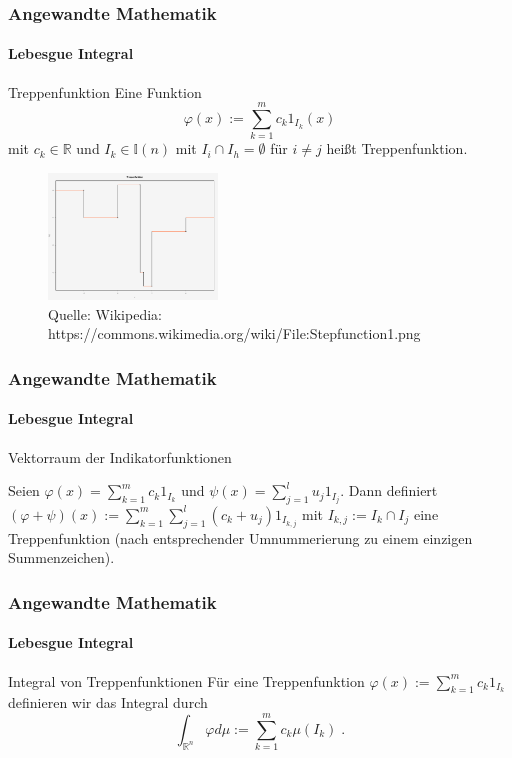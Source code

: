 \documentclass{beamer}
\begin{document}
\begin{frame}
    \frametitle{Angewandte Mathematik}
\framesubtitle{Lebesgue Integral}
    \begin{block}{Treppenfunktion}
Eine Funktion 
$$ \varphi(x) := \sum_{k=1}^m c_k 1_{I_k}(x)$$ mit $c_k \in \mathbb{R}$ und $I_k \in \mathbb{I}(n)$ mit $I_i \cap I_h = \emptyset$ für $i \neq j$
heißt Treppenfunktion.
\end{block}


\begin{figure}[H]
      \centering
    \includegraphics[width=0.4\textwidth]{images/640px-Stepfunction1}
      \caption{Quelle: Wikipedia: https://commons.wikimedia.org/wiki/File:Stepfunction1.png}

\end{figure}
 \end{frame}


\begin{frame}
    \frametitle{Angewandte Mathematik}
\framesubtitle{Lebesgue Integral}
    \begin{block}{Vektorraum der Indikatorfunktionen}

Seien $\varphi(x) =   \sum_{k=1}^m  c_k 1_{I_k}$ und $\psi(x) =  \sum_{j=1}^l  u_j 1_{I_j}$. Dann definiert
$(\varphi + \psi)(x) := \sum_{k=1}^m \sum_{j=1}^l   (c_k + u_j) 1_{I_{k,j}}$ mit $I_{k,j}:= I_k \cap I_j$ eine Treppenfunktion (nach entsprechender Umnummerierung zu einem einzigen Summenzeichen).
\end{block}

 \end{frame}


\begin{frame}
    \frametitle{Angewandte Mathematik}
\framesubtitle{Lebesgue Integral}
    \begin{block}{Integral von Treppenfunktionen}
Für eine Treppenfunktion $ \varphi(x) := \sum_{k=1}^m c_k 1_{I_k}$ definieren wir das Integral durch
$$\int_{\mathbb{R}^n} \varphi d\mu := \sum_{k =1}^m  c_k \mu(I_k) \; . $$
\end{block} 
\end{frame}
\end{document}
